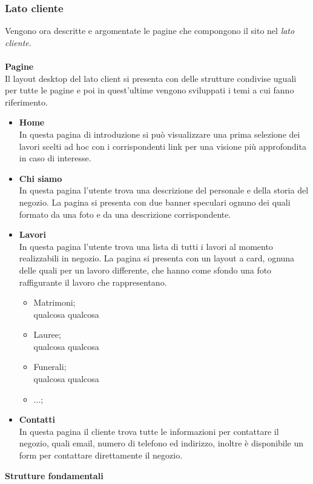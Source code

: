 \subsubsection{Lato cliente}
Vengono ora descritte e argomentate le pagine che compongono il sito nel \textit{lato cliente}.\\\\
\textbf{Pagine}\\
Il layout desktop del lato client si presenta con delle strutture condivise uguali per tutte le pagine e poi in quest'ultime vengono sviluppati i temi a cui fanno riferimento.
	\begin{itemize}
		\item \textbf{Home} \\In questa pagina di introduzione si può visualizzare una prima selezione dei lavori scelti ad hoc con i corrispondenti link per una visione più approfondita in caso di interesse.
		\item \textbf{Chi siamo}\\In questa pagina l'utente trova una descrizione del personale e della storia del negozio. La pagina si presenta con due banner speculari ognuno dei quali formato da una foto e da una descrizione corrispondente.
		\item \textbf{Lavori}\\In questa pagina l'utente trova una lista di tutti i lavori al momento realizzabili in negozio. La pagina si presenta con un layout a card, ognuna delle quali per un lavoro differente, che hanno come sfondo una foto raffigurante il lavoro che rappresentano.
	 	\begin{itemize}
 			\item Matrimoni;\\	qualcosa qualcosa 
	 		\item Lauree;\\	qualcosa qualcosa 
 			\item Funerali;\\	qualcosa qualcosa
 			\item ...; 		 		
	 	\end{itemize}
	 	\item \textbf{Contatti}\\In questa pagina il cliente trova tutte le informazioni per contattare il negozio, quali email, numero di telefono ed indirizzo, inoltre è disponibile un form per contattare direttamente il negozio.
 	\end{itemize}
\textbf{Strutture fondamentali}\\ 
